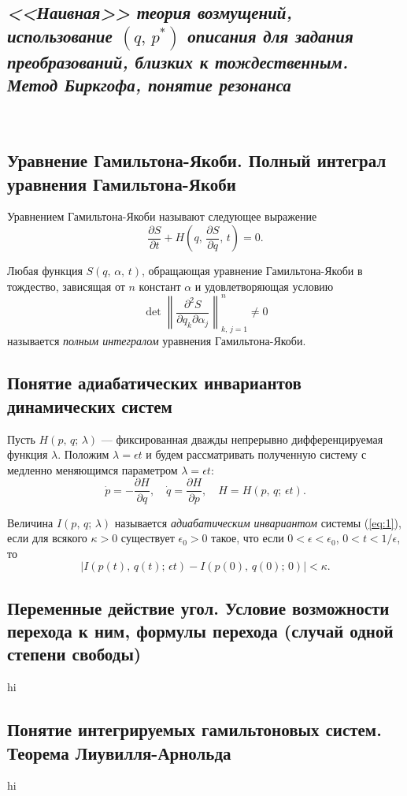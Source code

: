 \documentclass[a4paper]{article}
\begin{document}
\subsection{\emph{<<Наивная>> теория возмущений, использование $(q,\,p^*)$ описания
для задания преобразований, близких к тождественным. Метод Биркгофа, понятие
резонанса}}
🤔🤔🤔
\subsection{Уравнение Гамильтона-Якоби. Полный интеграл уравнения
Гамильтона-Якоби}
\begin{dfn}
	Уравнением Гамильтона-Якоби называют следующее выражение
\[
	\frac{\partial S}{\partial t} +H\left(q,\,\frac{\partial S}{\partial q} ,\,t\right)=0
.\]
\end{dfn}
\begin{dfn}
Любая функция $S(q,\,\alpha,\,t)$, обращающая уравнение Гамильтона-Якоби в
тождество, зависящая от $n$ констант $\alpha$ и удовлетворяющая условию
\[
\det \left\| \frac{\partial^2 S}{\partial q_k \partial \alpha_j} \right\|^n_{k,\,j=1}\neq 0
\]
называется \emph{полным интегралом} уравнения Гамильтона-Якоби.
\end{dfn}
\subsection{Понятие адиабатических инвариантов динамических систем}
Пусть $H(p,\,q;\,\lambda)$ --- фиксированная дважды непрерывно дифференцируемая
функция $\lambda$. Положим $\lambda=\epsilon t$ и будем рассматривать
полученную систему с медленно меняющимся параметром $\lambda=\epsilon t$:
\[
	\dot{p}=-\frac{\partial H}{\partial q} , \quad
	\dot{q}=\frac{\partial H}{\partial p} ,\quad H=H(p,\,q;\,\epsilon t)
	\tag{*}
	\label{eq:1}
.\] 
\begin{dfn}
	Величина $I(p,\,q;\,\lambda)$ называется \emph{адиабатическим 
	инвариантом} системы (\ref{eq:1}), если для всякого $\kappa>0$
	существует   $\epsilon_0>0$ такое, что если  $0<\epsilon<\epsilon_0$,
	$0<t<1 /\epsilon$, то
	 \[
		 |I(p(t),\,q(t);\,\epsilon t)-I(p(0),\,q(0);\,0)|<\kappa
	.\] 
\end{dfn}
\subsection{Переменные действие угол. Условие возможности перехода к ним,
формулы
перехода (случай одной степени свободы)}
hi
\subsection{Понятие интегрируемых гамильтоновых систем. Теорема
Лиувилля-Арнольда}
hi
\end{document}
